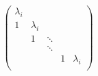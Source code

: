 \documentclass[UTF8]{ctexart}
\begin{document}

\[
\left(
\begin{array}{ccccc}
\lambda_i & & & & \\
1 & \lambda_i & & & \\
& 1 & \ddots & & \\
& & \ddots & & \\
& & & 1 & \lambda_i \\
\end{array}
\right)
\]

\end{document}
